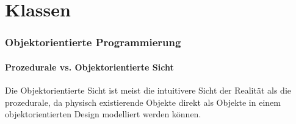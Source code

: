 

\part{Klassen}

\section{Objektorientierte Programmierung}

\subsection{Prozedurale vs. Objektorientierte Sicht}
Die Objektorientierte Sicht ist meist die intuitivere Sicht der Realität als die prozedurale, da physisch existierende Objekte direkt als Objekte in einem objektorientierten Design modelliert werden können.

